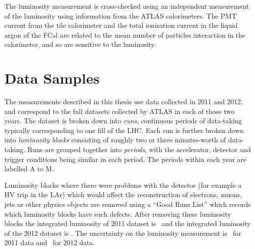 The luminosity measurement is cross-checked using an independent measurement of
the luminosity using information from the ATLAS calorimeters. The PMT current
from the tile calorimeter and the total ionisation current in the liquid argon
of the FCal are related to the mean number of particles interaction in the
calorimeter, and so are sensitive to the luminosity. 

\section{Data Samples}

The measurements described in this thesis use data collected in 2011 and 2012,
and correspond to the full datasets collected by ATLAS in each of those two
years. The dataset is broken down into {\it runs}, continuous periods of
data-taking typically corresponding to one fill of the LHC. Each run is further
broken down into {\it luminosity blocks} consisting of roughly two or three
minutes-worth of data-taking. Runs are grouped together into {\it periods}, with
the accelerator, detector and trigger conditions being similar in each period.
The periods within each year are labelled A to M.

Luminosity blocks where there were problems with the detector (for example a HV
trip in the LAr) which would affect the reconstruction of electrons, muons, jets
or other physics objects are removed using a ``Good Runs List'' which records
which luminosity blocks have such defects. After removing these luminosity
blocks the integrated luminosity of 2011 dataset is \LumiPassGRLTwentyEleven\
and the integrated luminosity of the 2012 dataset is
\LumiPassGRLTwentyTwelve\ifb. The uncertainty on the luminosity measurement is
\LumiUncTwentyEleven\ for 2011 data and
\LumiUncTwentyTwelve\ for 2012 data.

